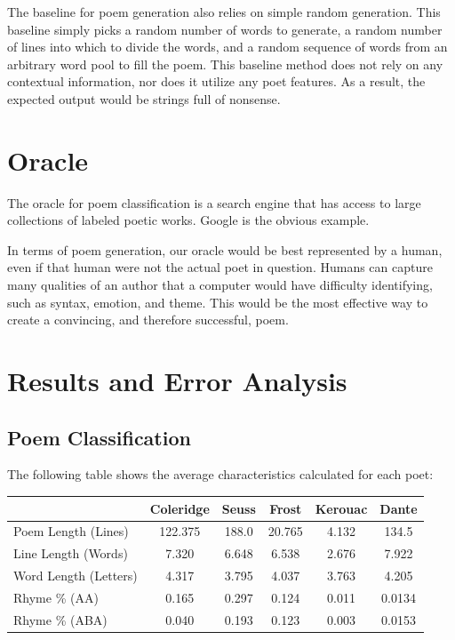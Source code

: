 \documentclass[journal]{IEEEtran}
\begin{document}
The baseline for poem generation also relies on simple random generation. This baseline simply picks a random number of words to generate, a random number of lines into which to divide the words, and a random sequence of words from an arbitrary word pool to fill the poem. This baseline method does not rely on any contextual information, nor does it utilize any poet features. As a result, the expected output would be strings full of nonsense.

\section{Oracle}
The oracle for poem classification is a search engine that has access to large collections of labeled poetic works. Google is the obvious example.

In terms of poem generation, our oracle would be best represented by a human, even if that human were not the actual poet in question. Humans can capture many qualities of an author that a computer would have difficulty identifying, such as syntax, emotion, and theme. This would be the most effective way to create a convincing, and therefore successful, poem.

\section{Results and Error Analysis}
\subsection{Poem Classification}
The following table shows the average characteristics calculated for each poet:
\begin{center}
    \begin{minipage}{\columnwidth}
         \label{tab:characteristics} 
        \centering
        \begin{tabular}{|p{1cm}|c|c|c|c|c|}
            \hline
            & \textbf{Coleridge} & \textbf{Seuss} & \textbf{Frost} & \textbf{Kerouac} &\textbf{Dante}\\
            \hline
            \small{Poem Length (Lines)} & 122.375&188.0&20.765&4.132&134.5\\
            \hline
            \small{Line Length (Words)}&7.320&6.648&6.538&2.676&7.922\\           
            \hline
            \small{Word Length (Letters)}&4.317&3.795&4.037&3.763&4.205\\            
            \hline
            \small{Rhyme  \% (AA)}&0.165&0.297&0.124&0.011&0.0134\\
            \hline
            \small{Rhyme \% (ABA)}&0.040&0.193&0.123&0.003&0.0153\\            
            \hline
            
            
        \end{tabular}    
    \end{minipage}
\end{center}
\end{document}
